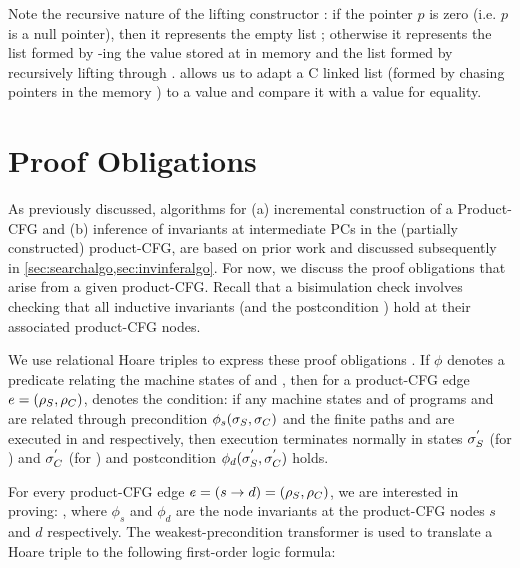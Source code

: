 Note the recursive nature of the lifting constructor : if the pointer $p$ is zero
(i.e. $p$ is a null pointer), then it represents the empty list ;
otherwise it represents the list formed by -ing the value stored at
 in memory \mem{} and the list formed by recursively
lifting  through .
 allows us to adapt a C linked list (formed by chasing pointers
in the memory \mem{}) to a  value and compare it with a \SpecL{} 
value for equality.

\section{Proof Obligations}
\label{sec:proofobl}
As previously discussed, algorithms for (a) incremental construction of a Product-CFG
and (b) inference of invariants at intermediate PCs in the (partially constructed) product-CFG, are
based on prior work\cite{oopsla20} and discussed subsequently in \cref{sec:searchalgo,sec:invinferalgo}.
For now, we discuss the proof obligations that arise from a given product-CFG.
Recall that a bisimulation check involves checking that all inductive invariants
(and the postcondition \post{}) hold at their associated product-CFG nodes.

We use relational Hoare triples to express these proof obligations \cite{relationalHoareLogic,hoareTriple}.
If $\phi$ denotes a predicate relating the machine states of \sprog{} and \cprog{}, then
for a product-CFG edge $e=({\tt \rho}_{S},{\tt \rho}_{C})$, 
denotes the condition:
if any machine states \sv{\sigma} and \cv{\sigma} of programs \sprog{} and \cprog{} are related through
precondition $\phi_s({\tt \sigma}_{S},{\tt \sigma}_{C})$ and the finite paths \sv{\rho} and \cv{\rho}
are executed in \sprog{} and \cprog{} respectively,
then execution terminates normally in states ${\tt \sigma}_{S}^{'}$ (for \sprog{}) and
${\tt \sigma}_{C}^{'}$ (for \cprog{}) and postcondition $\phi_d({\tt \sigma}_{S}^{'},{\tt \sigma}_{C}^{'})$ holds.

For every product-CFG edge $e = (s \rightarrow d) = ({\tt \rho}_{S}, {\tt \rho}_{C})$,
we are interested in proving: ,
where $\phi_s$ and $\phi_d$ are the node invariants at the product-CFG nodes $s$ and $d$
respectively.
The weakest-precondition transformer is used to translate a Hoare triple
 to the following
first-order logic formula:

